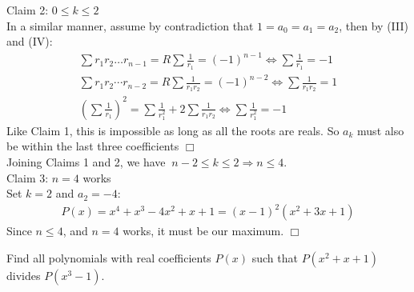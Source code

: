 \begin{solution}[$n=4$]
    Claim 2: $0 \leq k \leq 2$ \\[1.2mm]
        In a similar manner, assume by contradiction that $1 = a_0 = a_1 = a_2$, then by (III) and (IV):
        \begin{align*}
            \sum r_1 r_2 \ldots r_{n-1} = R \sum \frac{1}{r_1} = (-1)^{n-1}\iff \sum \frac{1}{r_1} = -1 \\
            \sum r_1r_2 \cdots r_{n-2} = R \sum \frac{1}{r_1 r_2} = (-1)^{n-2} \iff \sum \frac{1}{r_1 r_2} = 1 \\
            \left( \sum \frac{1}{r_1}\right)^2 = \sum \frac{1}{r_1^2} + 2\sum \frac{1}{r_1 r_2} \iff \sum \frac{1}{r_1^2} = -1
        \end{align*}
        Like Claim 1, this is impossible as long as all the roots are reals. So $a_k$ must also be within the last three coefficients $\Box$ \\[1.5mm]
        Joining Claims 1 and 2, we have $\ n-2 \leq k \leq 2 \Rightarrow n \leq 4$. \\[2mm]
    Claim 3: $n=4$ works \\[1.2mm]
        Set $k = 2$ and $a_2 = -4$:
        \begin{align*}
            P(x) = x^4 + x^3 - 4x^2+ x + 1 = (x-1)^2 (x^2+3x+1)
        \end{align*}
        Since $n \leq 4$, and $n=4$ works, it must be our maximum. $\Box$
\end{solution}

\begin{problem}[A][9][INMO 2018]
    Find all polynomials with real coefficients \( P(x) \) such that  
\( P(x^2 + x + 1) \) divides \( P(x^3 - 1) \).
\end{problem}

